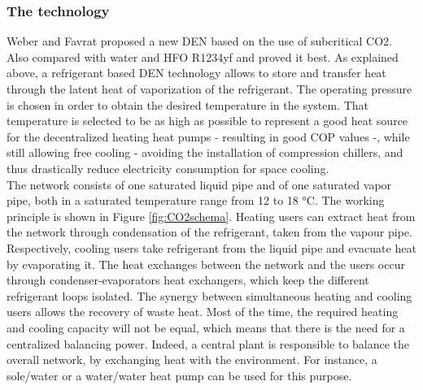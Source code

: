 \documentclass{article}
\begin{document}
\subsubsection{The technology}
Weber and Favrat \cite{weberConventionalAdvancedCO22010a} proposed a new DEN based on the use of subcritical CO2. 
Also compared with water and HFO R1234yf and proved it best\cite{henchozPotentialRefrigerantBased}.
As explained above, a refrigerant based DEN technology allows to store and transfer heat through the latent heat of vaporization of the refrigerant. The operating pressure is chosen in order to obtain the desired temperature in the system. That temperature is selected to be as high as possible to represent a good heat source for the decentralized heating heat pumps - resulting in good COP values -, while still allowing free cooling - avoiding the installation of compression chillers, and thus drastically reduce electricity consumption for space cooling. \\
The network consists of one saturated liquid pipe and of one saturated vapor pipe, both in a saturated temperature range from 12 to 18 \si{\celsius}\cite{suciuEnergyIntegrationCO22018}.
The working principle is shown in Figure \ref{fig:CO2schema}. Heating users can extract heat from the network through condensation of the refrigerant, taken from the vapour pipe. Respectively, cooling users take refrigerant from the liquid pipe and evacuate heat by evaporating it. The heat exchanges between the network and the users occur through condenser-evaporators heat exchangers, which keep the different refrigerant loops isolated\cite{henchozPotentialRefrigerantBased}. The synergy between simultaneous heating and cooling users allows the recovery of waste heat. Most of the time, the required heating and cooling capacity will not be equal, which means that there is the need for a centralized balancing power. Indeed, a central plant is responsible to balance the overall network, by exchanging heat with the environment. For instance, a sole/water or a water/water heat pump can be used for this purpose.\\

\end{document}
